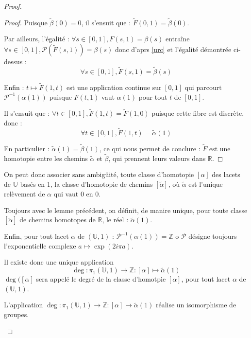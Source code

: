 \begin{proof}
\begin{proof}
Puisque $\tilde{\beta}(0)=0$, il s'ensuit que : $\tilde{F}(0,1)=\tilde{\beta}(0)$.

\par
Par ailleurs, l'\'egalit\'e : $\forall s\in[0,1],F(s,1)=\beta (s)$ entra\^ine %
$\forall s\in[0,1], \mathcal{P}(\tilde{F}(s,1))=\beta (s)$ donc d'aprs \ref{urc} et l'\'egalit\'e d\'emontr\'ee ci-dessus :
\[\forall s\in[0,1], \tilde{F}(s,1)=\tilde{\beta}(s)\]

Enfin : $t\mapsto\tilde{F}(1,t)$ est une application continue sur $[0,1]$ qui parcourt $\mathcal{P}^{-1}(\alpha (1))$ puisque $F(t,1)$ vaut $\alpha (1)$ pour tout $t$ de $[0,1]$. %

\par
Il s'ensuit que : $\forall t\in[0,1] , \tilde{F}(1,t)=\tilde{F}(1,0)$ puisque cette fibre est discr\`ete, donc :
\[\forall t\in[0,1],\tilde{F}(1,t)=\tilde{\alpha}(1)\]

En particulier : $\tilde{\alpha}(1)=\tilde{\beta}(1)$, ce qui nous permet de conclure : %
$\tilde{F}$ est une homotopie entre les chemins $\tilde{\alpha}$ et $\tilde{\beta}$, qui prennent leurs valeurs dans $\mathbb{R}$.
\end{proof}

On peut donc associer sans ambig\"uit\'e,  toute classe d'homotopie $[\alpha]$ des lacets de $\mathbb{U}$ bas\'es en $1$, %
la classe d'homotopie de chemins $[\tilde{\alpha}]$, o\`u $\tilde{\alpha}$ est l'unique rel\`evement de $\alpha$ qui vaut $0$ en $0$.

\par
Toujours avec le lemme pr\'ec\'edent, on d\'efinit, de manire unique, pour toute classe $[\tilde{\alpha}]$ de chemins homotopes de $\mathbb{R}$, le r\'eel : $\tilde{\alpha}(1)$.

\par
Enfin, pour tout lacet $\alpha$ de $(\mathbb{U},1)$ : %
$\mathcal{P}^{-1}(\alpha (1))=\mathbb{Z}$ o $\mathcal{P}$ d\'esigne toujours l'exponentielle complexe $a\mapsto\exp (2i\pi a)$.

\par
Il existe donc une unique application
\[\deg :\pi_1(\mathbb{U},1)\rightarrow \mathbb{Z}:[\alpha]\mapsto \tilde{\alpha}(1)\]
$\deg ([\alpha]$ sera appel\'e le degr\'e de la classe d'homotpie $[\alpha]$, pour tout lacet $\alpha$ de $(\mathbb{U},1)$.

\begin{lemm}\label{isodeg}
L'application $\deg :\pi_1(\mathbb{U},1)\rightarrow\mathbb{Z}:[\alpha]\mapsto\tilde{\alpha}(1)$ r\'ealise un isomorphisme de groupes.
\end{lemm}


\end{proof}
